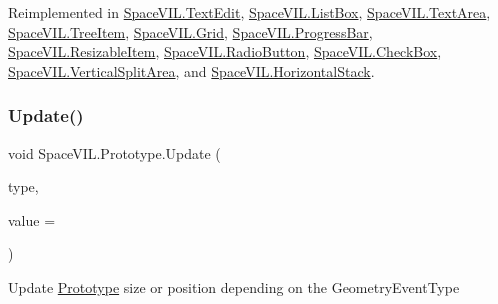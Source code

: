 Reimplemented in \mbox{\hyperlink{class_space_v_i_l_1_1_text_edit_a5e81be988e48303f9d552bdbe2953027}{Space\+V\+I\+L.\+Text\+Edit}}, \mbox{\hyperlink{class_space_v_i_l_1_1_list_box_a6e41c4678cdfd8b1a68ed0280b50cfff}{Space\+V\+I\+L.\+List\+Box}}, \mbox{\hyperlink{class_space_v_i_l_1_1_text_area_a214e3d5afc4c12519fb8594dce699ef0}{Space\+V\+I\+L.\+Text\+Area}}, \mbox{\hyperlink{class_space_v_i_l_1_1_tree_item_aa10abe8a9dafe4d597e041500618ec03}{Space\+V\+I\+L.\+Tree\+Item}}, \mbox{\hyperlink{class_space_v_i_l_1_1_grid_a2d3ce59b92ad9ca3bba2fb69feb549cb}{Space\+V\+I\+L.\+Grid}}, \mbox{\hyperlink{class_space_v_i_l_1_1_progress_bar_af970d2e5eed12540914beb9978e25665}{Space\+V\+I\+L.\+Progress\+Bar}}, \mbox{\hyperlink{class_space_v_i_l_1_1_resizable_item_a7f12553e7547d5ef653be8719e9cfee4}{Space\+V\+I\+L.\+Resizable\+Item}}, \mbox{\hyperlink{class_space_v_i_l_1_1_radio_button_a1272cbc6fa73f98592a91b53d1aa280a}{Space\+V\+I\+L.\+Radio\+Button}}, \mbox{\hyperlink{class_space_v_i_l_1_1_check_box_abcf26de1908f7d590b768d64851e8004}{Space\+V\+I\+L.\+Check\+Box}}, \mbox{\hyperlink{class_space_v_i_l_1_1_vertical_split_area_a665c01c8beced7686b57b7f4d41f3b70}{Space\+V\+I\+L.\+Vertical\+Split\+Area}}, and \mbox{\hyperlink{class_space_v_i_l_1_1_horizontal_stack_aa0650cd4cc25c1471f7b31748a6fd7e1}{Space\+V\+I\+L.\+Horizontal\+Stack}}.

\mbox{\label{class_space_v_i_l_1_1_prototype_a04c59a65bf5d4b493b925fd86c69b5ff}} 
\subsubsection{\texorpdfstring{Update()}{Update()}}
{\footnotesize\ttfamily void Space\+V\+I\+L.\+Prototype.\+Update (\begin{DoxyParamCaption}\item[{Geometry\+Event\+Type}]{type,  }\item[{int}]{value = {} }\end{DoxyParamCaption})\hspace{0.3cm}{\ttfamily [inline]}}



Update \mbox{\hyperlink{class_space_v_i_l_1_1_prototype}{Prototype}} size or position depending on the Geometry\+Event\+Type 



